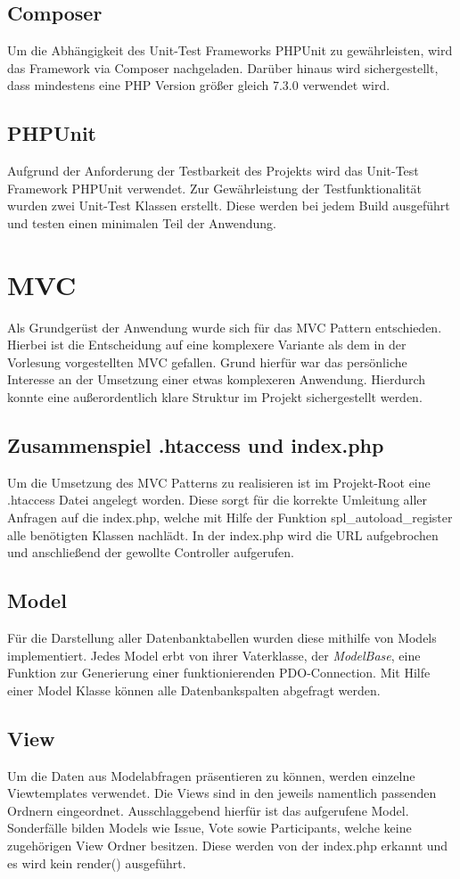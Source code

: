 \subsection{Composer}\label{subsec:composer}
Um die Abhängigkeit des Unit-Test Frameworks PHPUnit zu gewährleisten, wird das Framework via Composer nachgeladen. Darüber hinaus wird sichergestellt, dass mindestens eine PHP Version größer gleich 7.3.0 verwendet wird.
\subsection{PHPUnit}\label{subsec:phpunit}
Aufgrund der Anforderung der Testbarkeit des Projekts wird das Unit-Test Framework PHPUnit verwendet. Zur Gewährleistung der Testfunktionalität wurden zwei Unit-Test Klassen erstellt. Diese werden bei jedem Build ausgeführt und testen einen minimalen Teil der Anwendung.
\section{MVC}\label{sec:mvc}
Als Grundgerüst der Anwendung wurde sich für das MVC Pattern entschieden. Hierbei ist die Entscheidung auf eine komplexere Variante als dem in der Vorlesung vorgestellten MVC gefallen. Grund hierfür war das persönliche Interesse an der Umsetzung einer etwas komplexeren Anwendung. Hierdurch konnte eine außerordentlich klare Struktur im Projekt sichergestellt werden.
\subsection{Zusammenspiel .htaccess und index.php}\label{subsec:.htaccess}
Um die Umsetzung des MVC Patterns zu realisieren ist im Projekt-Root eine .htaccess Datei angelegt worden. Diese sorgt für die korrekte Umleitung aller Anfragen auf die index.php, welche mit Hilfe der Funktion spl\_{}autoload\_{}register alle benötigten Klassen nachlädt. In der index.php wird die URL aufgebrochen und anschließend der gewollte Controller aufgerufen.
\subsection{Model}\label{subsec:model}
Für die Darstellung aller Datenbanktabellen wurden diese mithilfe von Models implementiert. Jedes Model erbt von ihrer Vaterklasse, der \emph{ModelBase}, eine Funktion zur Generierung einer funktionierenden PDO-Connection. Mit Hilfe einer Model Klasse können alle Datenbankspalten abgefragt werden.
\subsection{View}\label{subsec:view}
Um die Daten aus Modelabfragen präsentieren zu können, werden einzelne Viewtemplates verwendet. Die Views sind in den jeweils namentlich passenden Ordnern eingeordnet. Ausschlaggebend hierfür ist das aufgerufene Model. Sonderfälle bilden Models wie Issue, Vote sowie Participants, welche keine zugehörigen View Ordner besitzen. Diese werden von der index.php erkannt und es wird kein render() ausgeführt. 

